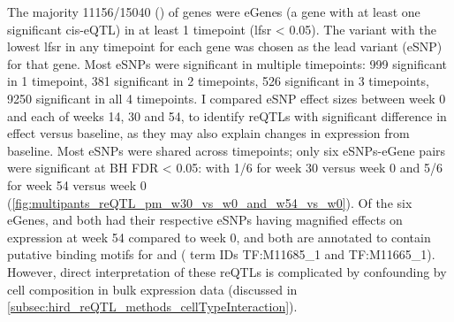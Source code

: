 

The majority 11156/15040 () of genes were eGenes (a gene with at least one significant cis-eQTL) in at least 1 timepoint (\gls{lfsr} < 0.05).
The variant with the lowest lfsr in any timepoint for each gene was 
chosen as the lead variant (eSNP) for that gene.
Most eSNPs were significant in multiple timepoints: 999 significant in 1 timepoint, 381 significant in 2 timepoints, 526 significant in 3 timepoints, 9250 significant in all 4 timepoints.
I compared eSNP effect sizes between week 0 and each of weeks 14, 30 and 54,
to identify \glspl{reQTL} with significant difference in effect versus baseline,
as they may also explain changes in expression from baseline.
Most eSNPs were shared across timepoints;
only six eSNPs-eGene pairs were significant at BH FDR < 0.05:
with 1/6 for week 30 versus week 0 and 5/6 for week 54 versus week 0 (\autoref{fig:multipants_reQTL_pm_w30_vs_w0_and_w54_vs_w0}).
Of the six eGenes,  and  both had their respective eSNPs having magnified effects on expression at week 54 compared to week 0,
and both are annotated to contain putative binding motifs for  and  ( term IDs TF:M11685\_1 and TF:M11665\_1).
However, direct interpretation of these reQTLs is complicated by confounding  by cell composition in bulk expression data (discussed in \autoref{subsec:hird_reQTL_methods_cellTypeInteraction}).


